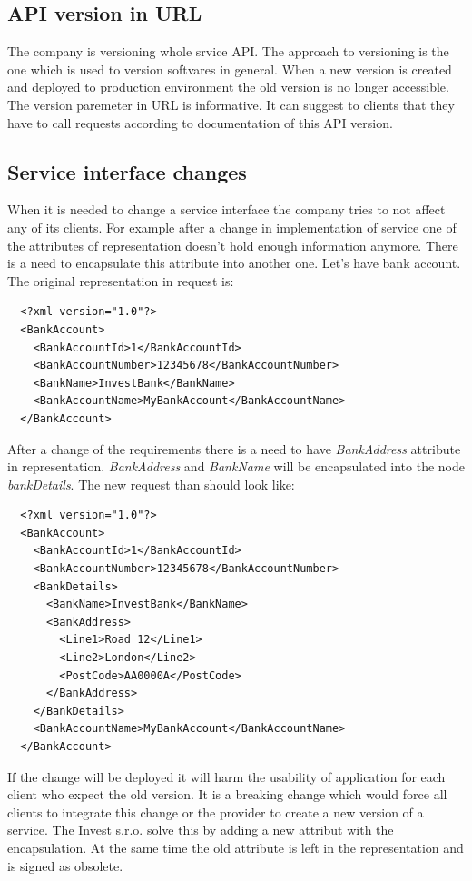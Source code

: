 \subsection{API version in URL}
The company is versioning whole srvice API. The approach to versioning is the one which is used to version softvares in general. When a new version is created and deployed to production environment the old version is no longer accessible. The version paremeter in URL is informative. It can suggest to clients that they have to call requests according to \gls{documentation} of this API version.

\subsection{Service interface changes}
When it is needed to change a service interface the company tries to not affect any of its clients. For example after a change in implementation of service one of the attributes of representation doesn't hold enough information anymore. There is a need to encapsulate this attribute into another one. Let's have bank account. The original representation in request is:

\begin{lstlisting}
  <?xml version="1.0"?>
  <BankAccount>
    <BankAccountId>1</BankAccountId>
    <BankAccountNumber>12345678</BankAccountNumber>
    <BankName>InvestBank</BankName>
    <BankAccountName>MyBankAccount</BankAccountName>
  </BankAccount>
\end{lstlisting}

After a change of the requirements there is a need to have \emph{BankAddress} attribute in representation. \emph{BankAddress} and \emph{BankName} will be encapsulated into the node \emph{bankDetails}. The new request than should look like:

\begin{lstlisting}
  <?xml version="1.0"?>
  <BankAccount>
    <BankAccountId>1</BankAccountId>
    <BankAccountNumber>12345678</BankAccountNumber>
    <BankDetails>
      <BankName>InvestBank</BankName>
      <BankAddress>
        <Line1>Road 12</Line1>
        <Line2>London</Line2>
        <PostCode>AA0000A</PostCode>
      </BankAddress>
    </BankDetails>
    <BankAccountName>MyBankAccount</BankAccountName>
  </BankAccount>
\end{lstlisting}

If the change will be deployed it will harm the usability of application for each client who expect the old version. It is a breaking change which would force all clients to integrate this change or the provider to create a new version of a service. The Invest s.r.o. solve this by adding a new attribut with the encapsulation. At the same time the old attribute is left in the representation and is signed as obsolete.

